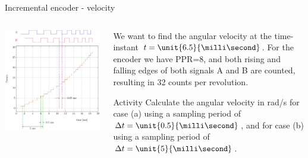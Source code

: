 \documentclass[presentation,aspectratio=169]{beamer}
\begin{document}
\begin{frame}[label={sec:org3daab96}]{Incremental encoder - velocity}
\begin{columns}
\begin{column}{0.5\columnwidth}
\begin{center}
\includegraphics[width=\textwidth]{../../figures/encoder-signals-nonuniform}
\end{center}
\end{column}
\begin{column}{0.5\columnwidth}
We want to find the angular velocity at the time-instant \(t=\unit{6.5}{\milli\second}\). For the encoder we have PPR=8, and both rising and falling edges of both signals A and B are counted, resulting in 32 counts per revolution.

\alert{Activity} Calculate the angular velocity in rad/s for case \alert{(a)} using a sampling period of \(\Delta t=\unit{0.5}{\milli\second}\), and for case \alert{(b)} using a sampling period of \(\Delta t=\unit{5}{\milli\second}\).
\end{column}
\end{columns}
\end{frame}
\end{document}
